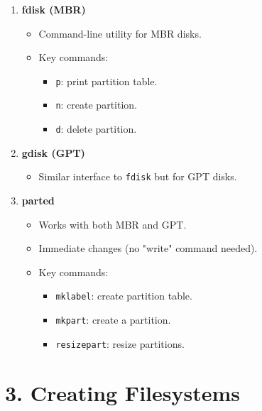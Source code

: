 \documentclass[a4paper]{report}
\begin{document}
\begin{enumerate}
    \item\textbf{fdisk (MBR)}
\begin{itemize}
    \item Command-line utility for MBR disks.
    \item Key commands:
    \begin{itemize}
        \item \texttt{p}: print partition table.
        \item \texttt{n}: create partition.
        \item \texttt{d}: delete partition.
    \end{itemize}
\end{itemize}

\item\textbf{gdisk (GPT)}
\begin{itemize}
    \item Similar interface to \texttt{fdisk} but for GPT disks.
\end{itemize}

\item\textbf{parted}
\begin{itemize}
    \item Works with both MBR and GPT.
    \item Immediate changes (no "write" command needed).
    \item Key commands:
    \begin{itemize}
        \item \texttt{mklabel}: create partition table.
        \item \texttt{mkpart}: create a partition.
        \item \texttt{resizepart}: resize partitions.
    \end{itemize}
\end{itemize}
\end{enumerate}

\section*{3. Creating Filesystems}
\end{document}
